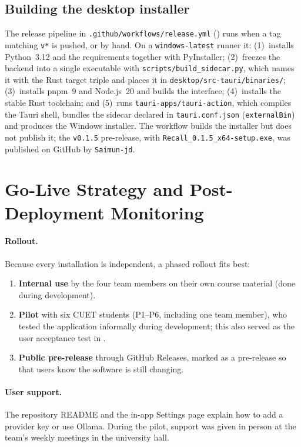 \subsection{Building the desktop installer}
The release pipeline in \texttt{.github/workflows/release.yml} () runs when a tag
matching \texttt{v*} is pushed, or by hand. On a \texttt{windows-latest} runner it:
(1)~installs Python~3.12 and the requirements together with PyInstaller;
(2)~freezes the backend into a single executable with \texttt{scripts/build\_sidecar.py}, which
names it with the Rust target triple and places it in \texttt{desktop/src-tauri/binaries/};
(3)~installs pnpm~9 and Node.js~20 and builds the interface;
(4)~installs the stable Rust toolchain; and
(5)~runs \texttt{tauri-apps/tauri-action}, which compiles the Tauri shell, bundles the sidecar
declared in \texttt{tauri.conf.json} (\texttt{externalBin}) and produces the Windows installer.
The workflow builds the installer but does not publish it; the \texttt{v0.1.5} pre-release, with
\texttt{Recall\_0.1.5\_x64-setup.exe}, was published on GitHub by \texttt{Saimun-jd}.

\section{Go-Live Strategy and Post-Deployment Monitoring}

\paragraph{Rollout.} Because every installation is independent, a phased rollout fits best:
\begin{enumerate}
  \item \textbf{Internal use} by the four team members on their own course material (done during
  development).
  \item \textbf{Pilot} with six CUET students (P1--P6, including one team member), who tested the
  application informally during development; this also served as the user acceptance test in
  .
  \item \textbf{Public pre-release} through GitHub Releases, marked as a pre-release so that users
  know the software is still changing.
\end{enumerate}

\paragraph{User support.} The repository README and the in-app Settings page explain how to add a
provider key or use Ollama. During the pilot, support was given in person at the team's weekly
meetings in the university hall.

